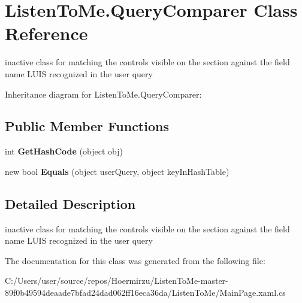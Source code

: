 \hypertarget{class_listen_to_me_1_1_query_comparer}{}\section{Listen\+To\+Me.\+Query\+Comparer Class Reference}
\label{class_listen_to_me_1_1_query_comparer}


inactive class for matching the controls visible on the section against the field name L\+U\+IS recognized in the user query  




Inheritance diagram for Listen\+To\+Me.\+Query\+Comparer\+:
\subsection*{Public Member Functions}
\begin{DoxyCompactItemize}
\item 
int {\bfseries Get\+Hash\+Code} (object obj)\hypertarget{class_listen_to_me_1_1_query_comparer_a700125ab1c7ee15c31485a1d1ca71a70}{}\label{class_listen_to_me_1_1_query_comparer_a700125ab1c7ee15c31485a1d1ca71a70}

\item 
new bool {\bfseries Equals} (object user\+Query, object key\+In\+Hash\+Table)\hypertarget{class_listen_to_me_1_1_query_comparer_a8c5ce93e1d11dcebbcc0693d4c425169}{}\label{class_listen_to_me_1_1_query_comparer_a8c5ce93e1d11dcebbcc0693d4c425169}

\end{DoxyCompactItemize}


\subsection{Detailed Description}
inactive class for matching the controls visible on the section against the field name L\+U\+IS recognized in the user query 



The documentation for this class was generated from the following file\+:\begin{DoxyCompactItemize}
\item 
C\+:/\+Users/user/source/repos/\+Hoermirzu/\+Listen\+To\+Me-\/master-\/89f0b49594deaade7bfad24dad062ff16eca36da/\+Listen\+To\+Me/Main\+Page.\+xaml.\+cs\end{DoxyCompactItemize}
